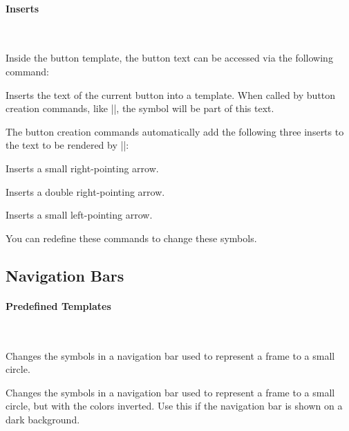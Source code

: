 \paragraph{Inserts}\ 

Inside the button template, the button text can be accessed via the
following command:

\begin{command}{\insertbuttontext}
  Inserts the text of the current button into a template. When called
  by  button creation commands, like |\beamerskipbutton|, the symbol
  will be part of this text.
\end{command}

The button creation commands automatically add the following three
inserts to the text to be rendered by |\insertbuttontext|:

\begin{command}{\insertgotosymbol}
  Inserts a small right-pointing arrow.
\end{command}

\begin{command}{\insertskipsymbol}
  Inserts a double right-pointing arrow.
\end{command}

\begin{command}{\insertreturnsymbol}
  Inserts a small left-pointing arrow.
\end{command}

You can redefine these commands to change these symbols.




\subsection{Navigation Bars}

\paragraph{Predefined Templates}\ 

\begin{command}{\beamertemplatecircleminiframe}
  Changes the symbols in a navigation bar used to represent
  a frame to a small circle.
\end{command}

\begin{command}{\beamertemplatecircleminiframeinverted}
  Changes the symbols in a navigation bar used to represent
  a frame to a small circle, but with the colors inverted. Use this if
  the navigation bar is shown on a dark background.
\end{command}

